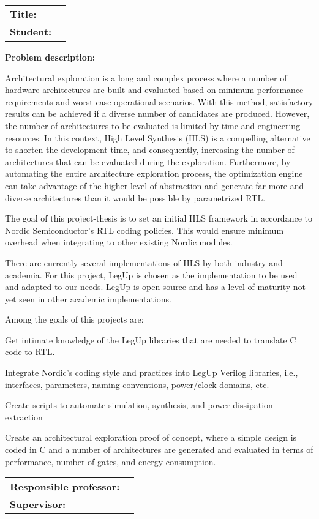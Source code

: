\begin{titlingpage}

\noindent
\begin{tabular}{@{}p{4cm}p{8cm}}
\textbf{Title:} 	& \thetitle \\
\textbf{Student:}	& \theauthor \\
\end{tabular}

\vspace{2ex}
\noindent\textbf{Problem description:}
\vspace{1ex}

Architectural exploration is a long and complex process where a number of hardware architectures are built and evaluated based on minimum performance requirements and worst-case operational scenarios. With this method, satisfactory results can be achieved if a diverse number of candidates are produced. However, the number of architectures to be evaluated is limited by time and engineering resources. In this context, High Level Synthesis (HLS) is a compelling alternative to shorten the development time, and consequently, increasing the number of architectures that can be evaluated during the exploration.
Furthermore, by automating the entire architecture exploration process, the optimization engine can take advantage of the higher level of abstraction and generate far more and diverse architectures than it would be possible by parametrized RTL.

The goal of this project-thesis is to set an initial HLS framework in accordance to Nordic Semiconductor's RTL coding policies. This would ensure minimum overhead when integrating to other existing Nordic modules.

There are currently several implementations of HLS by both industry and academia. For this project, LegUp is chosen as the implementation to be used and adapted to our needs. LegUp is open source and has a level of maturity not yet seen in other academic implementations.

Among the goals of this projects are:
\begin{compactitem}
\item Get intimate knowledge of the LegUp libraries that are needed to translate C code to RTL.
\item Integrate Nordic's coding style and practices into LegUp Verilog libraries, i.e., interfaces, parameters, naming conventions, power/clock domains, etc.
\item Create scripts to automate simulation, synthesis, and power dissipation extraction
\item Create an architectural exploration proof of concept, where a simple design is coded in C and a number of architectures are generated and evaluated in terms of performance, number of gates, and energy consumption.
\end{compactitem}
\vspace{2ex}

\noindent
\begin{tabular}{@{}p{4cm}l}
\textbf{Responsible professor:} 	& \theprofessor \\
\textbf{Supervisor:}			& \thesupervisor \\
\end{tabular}

\end{titlingpage}